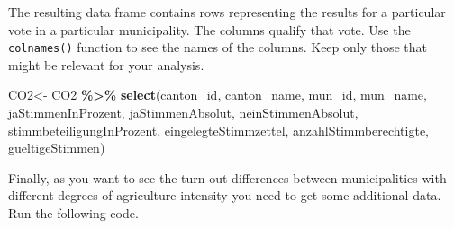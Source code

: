 \documentclass[
]{book}
\newenvironment{Shaded}{\begin{snugshade}}{\end{snugshade}}
\newcommand{\FunctionTok}[1]{\textcolor[rgb]{0.13,0.29,0.53}{\textbf{#1}}}
\newcommand{\NormalTok}[1]{#1}
\newcommand{\OtherTok}[1]{\textcolor[rgb]{0.56,0.35,0.01}{#1}}
\newcommand{\SpecialCharTok}[1]{\textcolor[rgb]{0.81,0.36,0.00}{\textbf{#1}}}
\begin{document}
The resulting data frame contains rows representing the results for a particular vote in a particular municipality. The columns qualify that vote. Use the \texttt{colnames()} function to see the names of the columns. Keep only those that might be relevant for your analysis.

\begin{Shaded}
\begin{Highlighting}[]
\NormalTok{CO2}\OtherTok{\textless{}{-}}\NormalTok{ CO2 }\SpecialCharTok{\%\textgreater{}\%}
  \FunctionTok{select}\NormalTok{(canton\_id, canton\_name, mun\_id, mun\_name, jaStimmenInProzent, jaStimmenAbsolut, neinStimmenAbsolut, stimmbeteiligungInProzent, eingelegteStimmzettel, anzahlStimmberechtigte, gueltigeStimmen)}
\end{Highlighting}
\end{Shaded}

Finally, as you want to see the turn-out differences between municipalities with different degrees of agriculture intensity you need to get some additional data. Run the following code.
\end{document}
